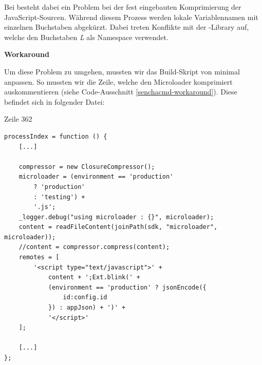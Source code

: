 Bei \kort besteht dabei ein Problem bei der fest eingebauten Komprimierung der JavaScript-Sourcen.
Während diesem Prozess werden lokale Variablennamen mit einzelnen Buchstaben abgekürzt.
Dabei treten Konflikte mit der -Library auf, welche den Buchstaben \emph{L} als Namespace verwendet.

\textbf{Workaround}

Um diese Problem zu umgehen, mussten wir das Build-Skript von  minimal anpassen.
So mussten wir die Zeile, welche den \gls{Microloader} komprimiert auskommentieren (siehe Code-Ausschnitt \ref{senchacmd-workaround}).
Diese befindet sich in folgender Datei:

 Zeile 362

\lstset{language=JavaScript}
\begin{lstlisting}[caption=Sencha Cmd Workaround, label=senchacmd-workaround]
processIndex = function () {
	[...]
	
	compressor = new ClosureCompressor();
	microloader = (environment == 'production'
		? 'production'
		: 'testing') +
		'.js';
	_logger.debug("using microloader : {}", microloader);
	content = readFileContent(joinPath(sdk, "microloader", microloader));
	//content = compressor.compress(content);
	remotes = [
		'<script type="text/javascript">' +
			content + ';Ext.blink(' +
			(environment == 'production' ? jsonEncode({
				id:config.id
			}) : appJson) + ')' +
			'</script>'
	];
	
	[...]
};
\end{lstlisting}
